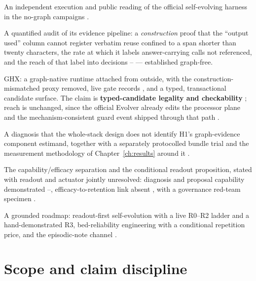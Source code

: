 \begin{description}[leftmargin=3.2em,style=nextline]
  \item[C1] An independent execution and public reading of the official
        self-evolving harness in the no-graph campaigns .
  \item[C2] A quantified audit of its evidence pipeline: a
        \emph{construction} proof that the ``output used'' column cannot
        register verbatim reuse confined to a span shorter than twenty characters, the rate at which it labels
        answer-carrying calls not referenced, and the reach of that label
        into decisions -- --- established graph-free.
  \item[C3] GHX: a graph-native runtime attached from outside, with the
        construction-mismatched proxy removed, live gate records ,
        and a typed, transactional candidate surface. The claim is
        \textbf{typed-candidate legality and checkability} ; reach is
        unchanged, since the official Evolver already edits the processor
        plane and the mechanism-consistent guard event shipped through that
        path .
  \item[C4] A diagnosis that the whole-stack design does not identify H1's
        graph-evidence component estimand, together with a separately
        protocolled bundle trial and the measurement methodology of
        Chapter~\ref{ch:results} around it .
  \item[C5] The capability/efficacy separation and the conditional readout
        proposition, stated with readout and actuator jointly unresolved:
        diagnosis and proposal capability demonstrated --,
        efficacy-to-retention link absent , with a
        governance red-team specimen
        .
  \item[C6] A grounded roadmap: readout-first self-evolution with a live
        R0--R2 ladder and a hand-demonstrated R3, bed-reliability
        engineering with a conditional repetition price, and the episodic-note channel
        .
\end{description}

\section{Scope and claim discipline}
\label{sec:scope}


